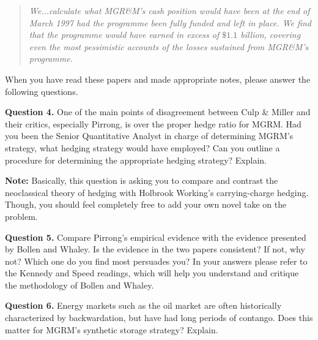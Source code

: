 \documentclass[12pt]{article}
\begin{document}
\begin{quote}
	\textit{We...calculate what MGR\&M's cash position would have been at the end of March 1997 had the programme been fully funded and left in place. We find that the 
	programme would have earned in excess of $\$1.1$ billion, covering even the most pessimistic accounts of the losses sustained from MGR\&M's programme.}
\end{quote}

\vspace{10mm}

When you have read these papers and made appropriate notes, please answer the following questions.

\vspace{10mm}

\textbf{Question 4.} One of the main points of disagreement between Culp \& Miller and their critics, especially Pirrong, is over the proper hedge ratio for MGRM. 
Had you been the Senior Quantitative Analyst in charge of determining MGRM's strategy, what hedging strategy would have employed? Can you outline a procedure for
determining the appropriate hedging strategy? Explain. 

\vspace{8mm}

\textbf{Note:} Basically, this question is asking you to compare and contrast the neoclassical theory of hedging with Holbrook Working's carrying-charge hedging. Though,
you should feel completely free to add your own novel take on the problem.

\vspace{10mm}

\textbf{Question 5.} Compare Pirrong's empirical evidence with the evidence presented by Bollen and Whaley. Is the evidence in the two papers consistent? If not, why not?
Which one do you find most persuades you? In your answers please refer to the Kennedy and Speed readings, which will help you understand and critique the methodology of 
Bollen and Whaley. 

\vspace{10mm}

\textbf{Question 6.} Energy markets such as the oil market are often historically characterized by backwardation, but have had long periods of contango. Does this matter
for MGRM's synthetic storage strategy? Explain.

\vspace{10mm}
\end{document}
